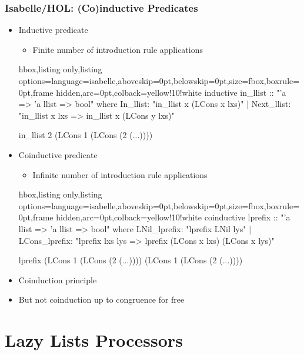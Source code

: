 \documentclass[aspectratio=169,10pt]{beamer}
\begin{document}
\begin{frame}[fragile]
  \frametitle{Isabelle/HOL: (Co)inductive Predicates}
  \begin{itemize}
    \item Inductive predicate
          \begin{itemize}
            \item Finite number of introduction rule applications
          \end{itemize}
\vspace*{-1ex}
\begin{tcblisting}{hbox,listing only,listing options={language=isabelle,aboveskip=0pt,belowskip=0pt},size=fbox,boxrule=0pt,frame hidden,arc=0pt,colback=yellow!10!white}
inductive in_llist :: "'a => 'a llist => bool" where
    In_llist: "in_llist x (LCons x lxs)"
  | Next_llist: "in_llist x lxs => in_llist x (LCons y lxs)"

in_llist 2 (LCons 1 (LCons (2 (...))))
\end{tcblisting}
\vspace*{-1ex}
          \pause
    \item Coinductive predicate
          \begin{itemize}
            \item Infinite number of introduction rule applications
          \end{itemize}
\vspace*{-1ex}
\begin{tcblisting}{hbox,listing only,listing options={language=isabelle,aboveskip=0pt,belowskip=0pt},size=fbox,boxrule=0pt,frame hidden,arc=0pt,colback=yellow!10!white}
coinductive lprefix :: "'a llist => 'a llist => bool" where
    LNil_lprefix: "lprefix LNil lys"
  | LCons_lprefix: "lprefix lxs lys => lprefix (LCons x lxs) (LCons x lys)"

lprefix (LCons 1 (LCons (2 (...)))) (LCons 1 (LCons (2 (...))))
\end{tcblisting}
\vspace*{-1ex}
          \pause
    \item Coinduction principle
    \item But not coinduction up to congruence for free
  \end{itemize}
\end{frame}

\section{Lazy Lists Processors}
\end{document}
